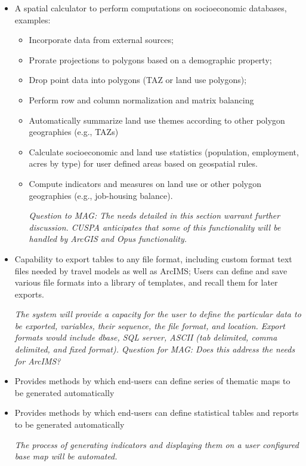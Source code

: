 \begin{itemize}
\item A spatial calculator to perform computations on socioeconomic databases, examples:
\begin{itemize}
\item Incorporate data from external sources;
\item Prorate projections to polygons based on a demographic property;
\item Drop point data into polygons (TAZ or land use polygons);
\item Perform row and column normalization and matrix balancing
\item Automatically summarize land use themes according to other polygon geographies (e.g., TAZs)
\item Calculate socioeconomic and land use statistics (population, employment, acres by type) for user defined areas based on geospatial rules.
\item Compute indicators and measures on land use or other polygon geographies (e.g., job-housing balance).

\emph{Question to MAG: The needs detailed in this section warrant further discussion.  CUSPA anticipates that some of this functionality will be handled by ArcGIS and Opus functionality.}

\end{itemize}

\item Capability to export tables to any file format, including custom format text files needed by travel models as well as ArcIMS; Users can define and save various file formats into a library of templates, and recall them for later exports.

\emph{The system will provide a capacity for the user to define the particular data to be exported, variables, their sequence, the file format, and location.  Export formats would include dbase, SQL server, ASCII (tab delimited, comma delimited, and fixed format). Question for MAG: Does this address the needs for ArcIMS?}

\item Provides methods by which end-users can define series of thematic maps to be generated automatically
\item Provides methods by which end-users can define statistical tables and reports to be generated automatically

\emph{The process of generating indicators and displaying them on a user configured base map will be automated.}

\end{itemize}

